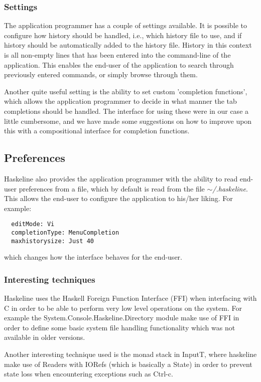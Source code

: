 \documentclass[11pt,a4paper]{article}
\begin{document}
\subsubsection{Settings}
The application programmer has a couple of settings available. It is possible to
configure how history should be handled, i.e., which history file to use, and if
history should be automatically added to the history file. History in this
context is all non-empty lines that has been entered into the command-line of
the application. This enables the end-user of the application to search through
previously entered commands, or simply browse through them.

Another quite useful setting is the ability to set custom 'completion
functions', which allows the application programmer to decide in what manner the
tab completions should be handled. The interface for using these were in our
case a little cumbersome, and we have made some suggestions on how to improve
upon this with a compositional interface for completion functions.

\subsection{Preferences}
Haskeline also provides the application programmer with the ability to read
end-user preferences from a file, which by default is read from the file
$\mathtt{\sim}$\textit{/.haskeline}. This allows the end-user to configure the
application to his/her liking. For example:

\begin{verbatim}
  editMode: Vi
  completionType: MenuCompletion
  maxhistorysize: Just 40
\end{verbatim}

which changes how the interface behaves for the end-user.

\subsubsection{Interesting techniques}
Haskeline uses the Haskell Foreign Function Interface (FFI) when interfacing
with C in order to be able to perform very low level operations on the system.
For example the System.Console.Haskeline.Directory module make use of FFI in
order to define some basic system file handling functionality which was not
available in older versions.

Another interesting technique used is the monad stack in InputT, where
haskeline make use of Readers with IORefs (which is basically a State) in order
to prevent state loss when encountering exceptions such as Ctrl-c.
\end{document}
